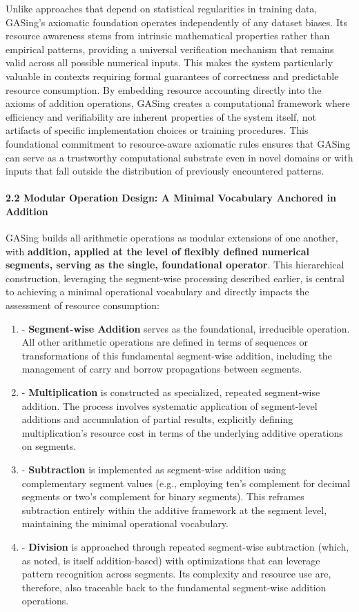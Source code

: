 \documentclass[11pt,a4paper]{article}
\begin{document}
Unlike approaches that depend on statistical regularities in training data, GASing's axiomatic foundation operates independently of any dataset biases. Its resource awareness stems from intrinsic mathematical properties rather than empirical patterns, providing a universal verification mechanism that remains valid across all possible numerical inputs. This makes the system particularly valuable in contexts requiring formal guarantees of correctness and predictable resource consumption. By embedding resource accounting directly into the axioms of addition operations, GASing creates a computational framework where efficiency and verifiability are inherent properties of the system itself, not artifacts of specific implementation choices or training procedures. This foundational commitment to resource-aware axiomatic rules ensures that GASing can serve as a trustworthy computational substrate even in novel domains or with inputs that fall outside the distribution of previously encountered patterns.

\paragraph{2.2 Modular Operation Design: A Minimal Vocabulary Anchored in Addition}
GASing builds all arithmetic operations as modular extensions of one another, with \textbf{addition, applied at the level of flexibly defined numerical segments, serving as the single, foundational operator}. This hierarchical construction, leveraging the segment-wise processing described earlier, is central to achieving a minimal operational vocabulary and directly impacts the assessment of resource consumption:

\begin{enumerate}
  \item - \textbf{Segment-wise Addition} serves as the foundational, irreducible operation. All other arithmetic operations are defined in terms of sequences or transformations of this fundamental segment-wise addition, including the management of carry and borrow propagations between segments.
  \item - \textbf{Multiplication} is constructed as specialized, repeated segment-wise addition. The process involves systematic application of segment-level additions and accumulation of partial results, explicitly defining multiplication's resource cost in terms of the underlying additive operations on segments.
  \item - \textbf{Subtraction} is implemented as segment-wise addition using complementary segment values (e.g., employing ten's complement for decimal segments or two's complement for binary segments). This reframes subtraction entirely within the additive framework at the segment level, maintaining the minimal operational vocabulary.
  \item - \textbf{Division} is approached through repeated segment-wise subtraction (which, as noted, is itself addition-based) with optimizations that can leverage pattern recognition across segments. Its complexity and resource use are, therefore, also traceable back to the fundamental segment-wise addition operations.
\end{enumerate}
\end{document}
